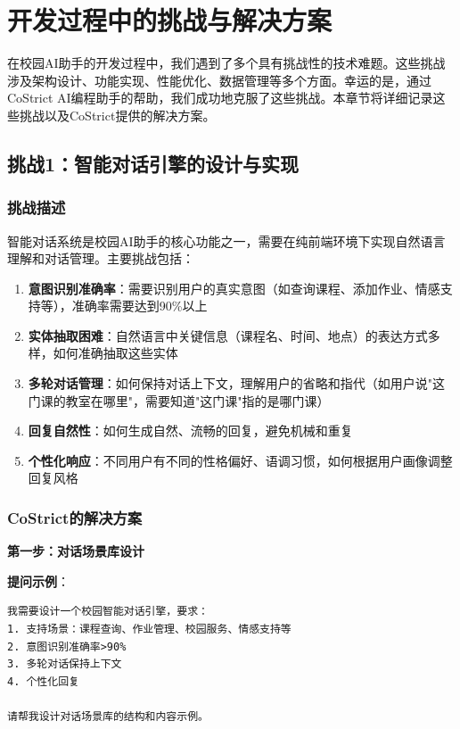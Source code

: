 ﻿\documentclass[12pt,a4paper]{article}
\begin{document}
\section{开发过程中的挑战与解决方案}

在校园AI助手的开发过程中，我们遇到了多个具有挑战性的技术难题。这些挑战涉及架构设计、功能实现、性能优化、数据管理等多个方面。幸运的是，通过CoStrict AI编程助手的帮助，我们成功地克服了这些挑战。本章节将详细记录这些挑战以及CoStrict提供的解决方案。

\subsection{挑战1：智能对话引擎的设计与实现}

\subsubsection{挑战描述}

智能对话系统是校园AI助手的核心功能之一，需要在纯前端环境下实现自然语言理解和对话管理。主要挑战包括：

\begin{enumerate}
    \item \textbf{意图识别准确率}：需要识别用户的真实意图（如查询课程、添加作业、情感支持等），准确率需要达到90\%以上
    \item \textbf{实体抽取困难}：自然语言中关键信息（课程名、时间、地点）的表达方式多样，如何准确抽取这些实体
    \item \textbf{多轮对话管理}：如何保持对话上下文，理解用户的省略和指代（如用户说"这门课的教室在哪里"，需要知道"这门课"指的是哪门课）
    \item \textbf{回复自然性}：如何生成自然、流畅的回复，避免机械和重复
    \item \textbf{个性化响应}：不同用户有不同的性格偏好、语调习惯，如何根据用户画像调整回复风格
\end{enumerate}

\subsubsection{CoStrict的解决方案}

\textbf{第一步：对话场景库设计}

\textbf{提问示例}：
\begin{verbatim}
我需要设计一个校园智能对话引擎，要求：
1. 支持场景：课程查询、作业管理、校园服务、情感支持等
2. 意图识别准确率>90%
3. 多轮对话保持上下文
4. 个性化回复

请帮我设计对话场景库的结构和内容示例。
\end{verbatim}
\end{document}
